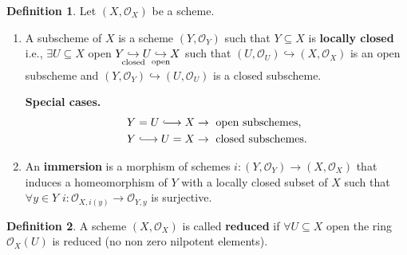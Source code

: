 \documentclass[12pt]{article}
\theoremstyle{definition}
\newtheorem*{definition}{Definition}
\begin{document}
\begin{definition}
Let $(X,\mathcal{O}_X)$ be a scheme.

\begin{enumerate}[label=\arabic*)]
\item A subscheme of $X$ is a scheme $(Y,\mathcal{O}_Y)$ such that $Y\subseteq X$ is \textbf{locally closed} i.e., $\exists U\subseteq X$ open $Y\underset{\mathclap{\text{closed}}}{\hookrightarrow}U\underset{\mathclap{\text{open}}}{\hookrightarrow}X$ such that $(U,\mathcal{O}_U)\hookrightarrow(X,\mathcal{O}_X)$ is an open subscheme and $(Y,\mathcal{O}_Y)\hookrightarrow(U,\mathcal{O}_U)$ is a closed subscheme.

\textbf{Special cases.}
\begin{align*}
Y=U\lhook\joinrel\longrightarrow X&\rightarrow\text{ open subschemes},\\
Y\lhook\joinrel\longrightarrow U=X&\rightarrow\text{ closed subschemes}.
\end{align*}

\item An \textbf{immersion} is a morphism of schemes $i:(Y,\mathcal{O}_Y)\rightarrow(X,\mathcal{O}_X)$ that induces a homeomorphism of $Y$ with a locally closed subset of $X$ such that $\forall y\in Y$ $i:\mathcal{O}_{X,i(y)}\rightarrow\mathcal{O}_{Y,y}$ is surjective.
\end{enumerate}
\end{definition}

\begin{definition}
A scheme $(X,\mathcal{O}_X)$ is called \textbf{reduced} if $\forall U\subseteq X$ open the ring $\mathcal{O}_X(U)$ is reduced (no non zero nilpotent elements).
\end{definition}
\end{document}
